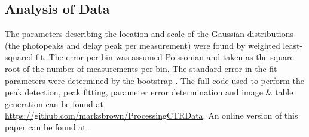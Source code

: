 \subsection{Analysis of Data}
The parameters describing the location and scale of the Gaussian distributions (the photopeaks and delay peak per measurement) were found by weighted least-squared fit. The error per bin was assumed Poissonian and taken as the square root of the number of measurements per bin. The standard error in the fit parameters were determined by the bootstrap \cite{degroot2012probability}. The full code used to perform the peak detection, peak fitting, parameter error determination and image \& table generation can be found at \href{https://github.com/marksbrown/ProcessingCTRData}{https://github.com/marksbrown/ProcessingCTRData}. An online version of this paper can be found at \cite{Brown2014}.